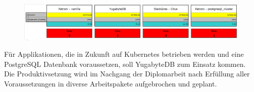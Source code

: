 \documentclass{ksgr_styles}
\begin{document}
\begin{managementsummary}
\begin{flushleft}
    \begin{figure}[H]
        \centering
        \includegraphics[width=0.75\linewidth]{source/implementation/evaluation/solution_comparison/cost_benefit_ranking}
        \label{fig:cost_benefit_diagram_management_summary}
    \end{figure}
            Für Applikationen, die in Zukunft auf \Gls{Kubernetes} betrieben werden und eine \Gls{PostgreSQL} Datenbank voraussetzen, soll YugabyteDB zum Einsatz kommen.\\
            Die Produktivsetzung wird im Nachgang der Diplomarbeit nach Erfüllung aller Voraussetzungen in diverse Arbeitspakete aufgebrochen und geplant.
        \end{flushleft}
    \end{managementsummary}

    \pagestyle{headings}
    \clearpage
        \hypersetup{hidelinks}
        \tableofcontents

    \thispagestyle{fancy} %
%    
    \startThesis %
    
    
    
    
    
\end{document}
